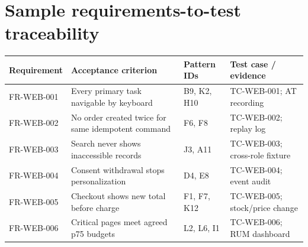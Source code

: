 \documentclass[11pt]{article}
\begin{document}
\section{Sample requirements-to-test traceability}

\begin{longtable}{@{}>{\raggedright\arraybackslash}p{27mm}>{\raggedright\arraybackslash}p{52mm}>{\raggedright\arraybackslash}p{26mm}>{\raggedright\arraybackslash}p{40mm}@{}}\toprule
Requirement & Acceptance criterion & Pattern IDs & Test case / evidence\\\midrule\endhead
FR-WEB-001 & Every primary task navigable by keyboard & B9, K2, H10 & TC-WEB-001; AT recording\\
FR-WEB-002 & No order created twice for same idempotent command & F6, F8 & TC-WEB-002; replay log\\
FR-WEB-003 & Search never shows inaccessible records & J3, A11 & TC-WEB-003; cross-role fixture\\
FR-WEB-004 & Consent withdrawal stops personalization & D4, E8 & TC-WEB-004; event audit\\
FR-WEB-005 & Checkout shows new total before charge & F1, F7, K12 & TC-WEB-005; stock/price change\\
FR-WEB-006 & Critical pages meet agreed p75 budgets & L2, L6, I1 & TC-WEB-006; RUM dashboard\\
\bottomrule\end{longtable}


\clearpage

\end{document}
